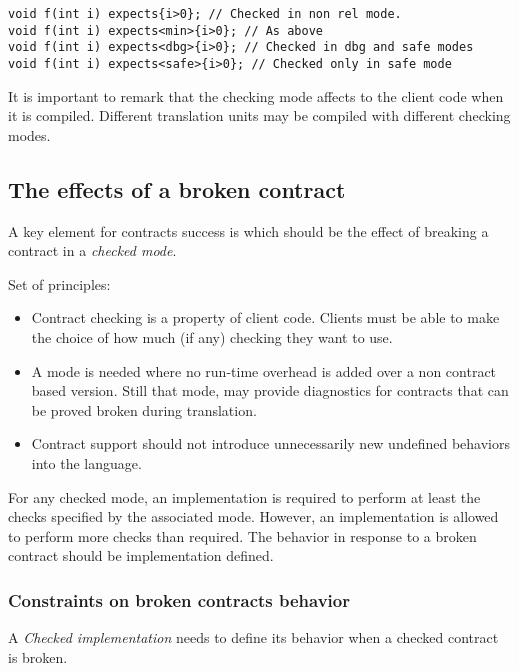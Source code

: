 \begin{lstlisting}
void f(int i) expects{i>0}; // Checked in non rel mode.
void f(int i) expects<min>{i>0}; // As above
void f(int i) expects<dbg>{i>0}; // Checked in dbg and safe modes
void f(int i) expects<safe>{i>0}; // Checked only in safe mode
\end{lstlisting}

It is important to remark that the checking mode affects to the client code when
it is compiled. Different translation units may be compiled with different
checking modes.

\subsection{The effects of a broken contract}

A key element for contracts success is which should be the effect of breaking a
contract in a \emph{checked mode}. 

Set of principles:

\begin{itemize}

\item Contract checking is a property of client code. Clients must be able to
make the choice of how much (if any) checking they want to use.

\item A mode is needed where no run-time overhead is added over a non contract
based version. Still that mode, may provide diagnostics for contracts that can
be proved broken during translation.

\item Contract support should not introduce unnecessarily new undefined behaviors
into the language.

\end{itemize}
 
For any checked mode, an implementation is required to perform at least the
checks specified by the associated mode. However, an implementation is allowed
to perform more checks than required. The behavior in response to a broken
contract should be implementation defined.

\subsubsection{Constraints on broken contracts behavior}

A \emph{Checked implementation} needs to define its behavior when a checked
contract is broken.

